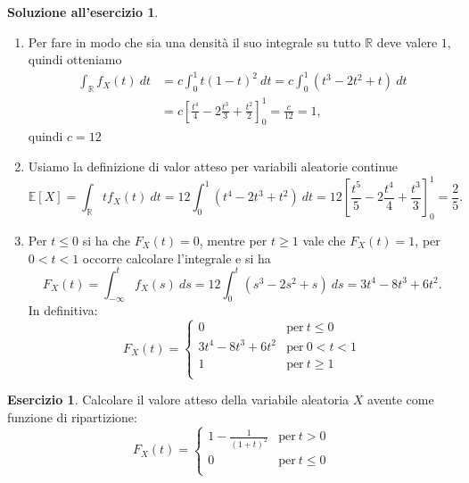 \documentclass[12pt,a4paper]{article}
\theoremstyle{definition}
\newtheorem{sol}{Soluzione all'esercizio}
\newtheorem{exe}{Esercizio}
\begin{document}
\begin{sol}
	\begin{enumerate}
		\item Per fare in modo che sia una densità il suo integrale su tutto $ \mathbb{R} $ deve valere $ 1 $, quindi otteniamo
		      \[ \begin{split}
				      \int_{\mathbb{R}} f_{X}(t) \ dt & = c \int_{0}^{1} t(1-t)^2 \ dt = c\int_{0}^{1}(t^3 -2t^2 + t) \ dt                           \\
				                                      & = c \left[\frac{t^4}{4} - 2 \frac{t^3}{3} + \frac{t^2}{2}\right]_{0}^{1} = \frac{c}{12} = 1,
			      \end{split}  \]
		      quindi $ c = 12 $
		\item Usiamo la definizione di valor atteso per variabili aleatorie continue
		      \[ \mathbb{E}[X] = \int_{\mathbb{R}} t f_{X}(t) \ dt = 12 \int_{0}^{1}(t^4 - 2t^3 + t^2) \ dt = 12 \left[\frac{t^5}{5} - 2 \frac{t^4}{4} + \frac{t^3}{3}\right]_{0}^{1} = \frac25. \]
		\item Per $ t \le 0$ si ha che $ F_X(t) = 0 $, mentre per $ t \ge 1 $ vale che $ F_{X}(t) = 1 $, per $ 0 < t < 1 $ occorre calcolare l'integrale e si ha
		      \[ F_{X}(t) = \int_{-\infty}^{t}f_{X}(s) \ ds = 12 \int_{0}^{t}(s^3 -2s^2 + s) \ ds = 3t^4 - 8t^3 + 6t^2.\]
		      In definitiva:
		      \[ F_{X}(t) = \begin{cases}
				      0                  & \text{per} \ t\le 0  \\
				      3t^4 - 8t^3 + 6t^2 & \text{per} \ 0<t<1   \\
				      1                  & \text{per} \ t \ge 1 \\
			      \end{cases} \]
	\end{enumerate}
\end{sol}

\begin{exe}
	Calcolare il valore atteso della variabile aleatoria $ X $ avente come funzione di ripartizione:
	\[ F_{X}(t) = \begin{cases}
			1- \frac{1}{(1+t)^2} & \text{per} \ t>0   \\
			0                    & \text{per} \ t\le0 \\
		\end{cases} \]
\end{exe}
\end{document}
